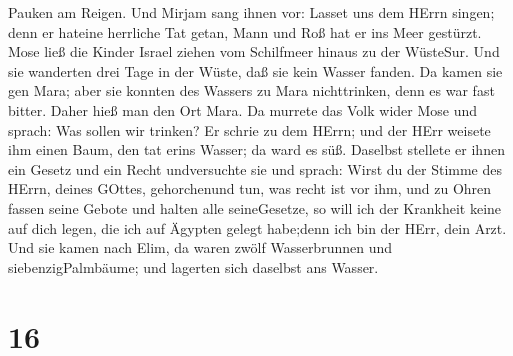 Pauken am Reigen.  Und Mirjam sang ihnen vor: Lasset uns
dem HErrn singen; denn er hateine herrliche Tat getan, Mann und Roß hat
er ins Meer gestürzt.  Mose ließ die Kinder Israel ziehen
vom Schilfmeer hinaus zu der WüsteSur. Und sie wanderten drei Tage in
der Wüste, daß sie kein Wasser fanden.  Da kamen sie gen
Mara; aber sie konnten des Wassers zu Mara nichttrinken, denn es war
fast bitter. Daher hieß man den Ort Mara.  Da murrete das
Volk wider Mose und sprach: Was sollen wir trinken?  Er
schrie zu dem HErrn; und der HErr weisete ihm einen Baum, den tat erins
Wasser; da ward es süß. Daselbst stellete er ihnen ein Gesetz und ein
Recht undversuchte sie  und sprach: Wirst du der Stimme des
HErrn, deines GOttes, gehorchenund tun, was recht ist vor ihm, und zu
Ohren fassen seine Gebote und halten alle seineGesetze, so will ich der
Krankheit keine auf dich legen, die ich auf Ägypten gelegt habe;denn ich
bin der HErr, dein Arzt.  Und sie kamen nach Elim, da waren
zwölf Wasserbrunnen und siebenzigPalmbäume; und lagerten sich daselbst
ans Wasser.

\hypertarget{section-15}{%
\section{16}\label{section-15}}


